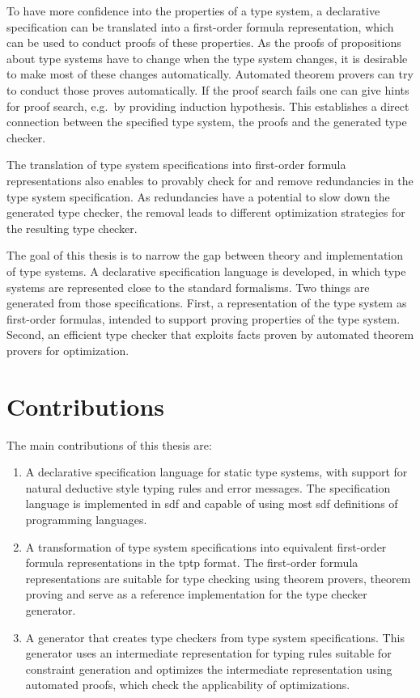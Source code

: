 To have more confidence into the properties of a type system, a
declarative specification can be translated into a first-order formula
representation, which can be used to conduct proofs of these
properties. As the proofs of propositions about type systems have to
change when the type system changes, it is desirable to make most of
these changes automatically. Automated theorem provers can try to
conduct those proves automatically. If the proof search fails one can
give hints for proof search, e.g.\ by providing induction
hypothesis. This establishes a direct connection between the specified
type system, the proofs and the generated type checker.

The translation of type system specifications into first-order formula
representations also enables to provably check for and remove
redundancies in the type system specification. As redundancies have a
potential to slow down the generated type checker, the removal leads
to different optimization strategies for the resulting type checker.

The goal of this thesis is to narrow the gap between theory and
implementation of type systems. A declarative specification language
is developed, in which type systems are represented close to the
standard formalisms. Two things are generated from those
specifications. First, a representation of the type system as
first-order formulas, intended to support proving properties of the
type system. Second, an efficient type checker that exploits facts
proven by automated theorem provers for optimization.

\section{Contributions}
The main contributions of this thesis are:
\begin{enumerate}
\item A declarative specification language for static type systems,
  with support for natural deductive style typing rules and error
  messages. The specification language is implemented in \gls{sdf} and
  capable of using most \gls{sdf} definitions of programming
  languages.
\item A transformation of type system specifications into equivalent
  first-order formula representations in the \gls{tptp} format. The
  first-order formula representations are suitable for type checking
  using theorem provers, theorem proving and serve as a reference
  implementation for the type checker generator.
\item A generator that creates type checkers from type system
  specifications. This generator uses an intermediate representation
  for typing rules suitable for constraint generation and optimizes
  the intermediate representation using automated proofs, which check
  the applicability of optimizations.
\end{enumerate}

